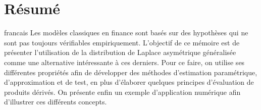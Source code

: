 \chapter*{Résumé} %

\begin{otherlanguage*}{francais}
  Les modèles classiques en finance sont basés sur des
  hypothèses qui ne sont pas toujours vérifiables
  empiriquement. L'objectif de ce mémoire est de présenter
  l'utilisation de la distribution de Laplace asymétrique généralisée
  comme une alternative intéressante à ces derniers. Pour ce faire, on
  utilise ses différentes propriétés afin de développer des méthodes
  d'estimation paramétrique, d'approximation et de test, en plus d'élaborer quelques principes d'évaluation de produits dérivés. On
  présente enfin un exemple d'application numérique afin d'illustrer ces
  différents concepts.
\end{otherlanguage*}

